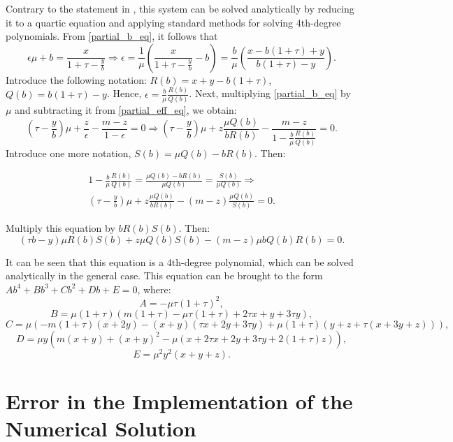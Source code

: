 \documentclass[12pt]{article}
\begin{document}
Contrary to the statement in \cite{Rolke_paper}, this system can be solved analytically by reducing it to a quartic equation and applying standard methods for solving 4th-degree polynomials.
From \eqref{partial_b_eq}, it follows that
$$\epsilon \mu + b = \frac{x}{1 + \tau - \frac{y}{b}} \Rightarrow \epsilon = \frac{1}{\mu} \left(\frac{x}{1 + \tau - \frac{y}{b}} - b\right) = \frac{b}{\mu} \left( \frac{x - b \left(1 + \tau\right) + y}{b \left(1 + \tau \right) - y}\right) .$$
Introduce the following notation: $R(b) = x + y - b \left(1 + \tau\right)$, $Q(b) = b \left(1 + \tau\right) - y$. Hence, $\epsilon = \frac{b}{\mu} \frac{R(b)}{Q(b)}$.
Next, multiplying \eqref{partial_b_eq} by $\mu$ and subtracting it from \eqref{partial_eff_eq}, we obtain:
$$\left(\tau - \frac{y}{b}\right) \mu + \frac{z}{\epsilon} - \frac{m - z}{1 - \epsilon} = 0 \Rightarrow \left(\tau - \frac{y}{b}\right) \mu + z\frac{\mu Q(b)}{b R(b)} - \frac{m - z}{1 - \frac{b}{\mu} \frac{R(b)}{Q(b)}} = 0 .$$
Introduce one more notation, $S(b) = \mu Q(b) - b R(b)$. Then:

\begin{equation}
\begin{split}
      1 - \frac{b}{\mu} \frac{R(b)}{Q(b)} = \frac{\mu Q(b) - b R(b)}{\mu Q(b)} = \frac{S(b)}{\mu Q(b)} \Rightarrow \\
       \left(\tau - \frac{y}{b}\right) \mu + z\frac{\mu Q(b)}{b R(b)} - \left(m -z\right) \frac{\mu Q(b)}{S(b)} = 0 .
\end{split}
\end{equation}

Multiply this equation by $b R(b) S(b)$. Then:
$$\left(\tau b - y \right) \mu R(b) S(b) + z \mu Q(b)S(b) - (m-z) \mu b Q(b) R(b) = 0 .$$

It can be seen that this equation is a 4th-degree polynomial, which can be solved analytically in the general case.
This equation can be brought to the form
$A b^4 + B b^3 + C b^2 + D b + E =0$, where:
$$A = - \mu \tau \left(1 + \tau\right)^2 ,$$
$$B = \mu (1+\tau) (m (1+\tau)-\mu \tau (1+\tau)+2 \tau x+y+3 \tau y) ,$$ 
$$C = \mu(-m (1+\tau) (x+2 y)-(x+y) (\tau x+2 y+3 \tau y)+\mu (1+\tau) (y+z+\tau (x+3 y+z))) ,$$
$$D = \mu y \left(m (x+y)+(x+y)^2-\mu (x+2 \tau x+2 y+3 \tau y+2 (1+\tau) z)\right) ,$$
$$E = \mu^2 y^2 (x + y + z) .$$


\section{Error in the Implementation of the Numerical Solution}
\end{document}
